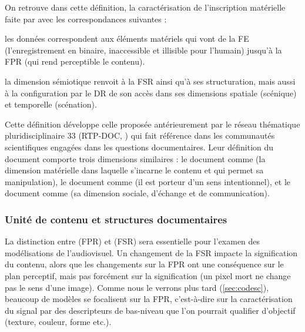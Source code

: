 On retrouve dans cette définition, la caractérisation de l'inscription matérielle faite par \cite{bachimont:icc} avec les correspondances suivantes : 
\begin{liste}
	\item les données correspondent aux éléments matériels qui vont de la FE (l'enregistrement en binaire, inaccessible et illisible pour l'humain) jusqu'à la FPR (qui rend perceptible le contenu). 
	\item la dimension sémiotique renvoit à la FSR ainsi qu'à ses structuration, mais aussi à la configuration par le DR de son accès dans ses dimensions spatiale (scénique) et temporelle (scénation).
\end{liste}

Cette définition développe celle proposée antérieurement par le réseau thématique pluridisciplinaire 33 (RTP-DOC, \cite{Pedauque2003}) qui fait référence dans les communautés scientifiques engagées dans les questions documentaires.
Leur définition du document comporte trois dimensions similaires : le document comme  (la dimension matérielle dans laquelle s’incarne le contenu et qui permet sa manipulation), le document comme  (il est porteur d’un sens intentionnel), et le document comme  (sa dimension sociale, d'échange et de communication).

 


\subsubsection{Unité de contenu et structures documentaires}\label{sec:uc-sd}
La distinction entre  (FPR) et  (FSR) sera essentielle pour l'examen des modélisations de l'audiovisuel.
Un changement de la FSR impacte la signification du contenu, alors que les changements sur la FPR ont une conséquence sur le plan perceptif, mais pas forcément sur la signification (un pixel mort ne change pas le sens d'une image).
Comme nous le verrons plus tard (\ref{sec:codesc}), beaucoup de modèles se focalisent sur la FPR, c'est-à-dire sur la caractérisation du signal par des descripteurs de bas-niveau que l'on pourrait qualifier d'objectif (texture, couleur, forme etc.).


